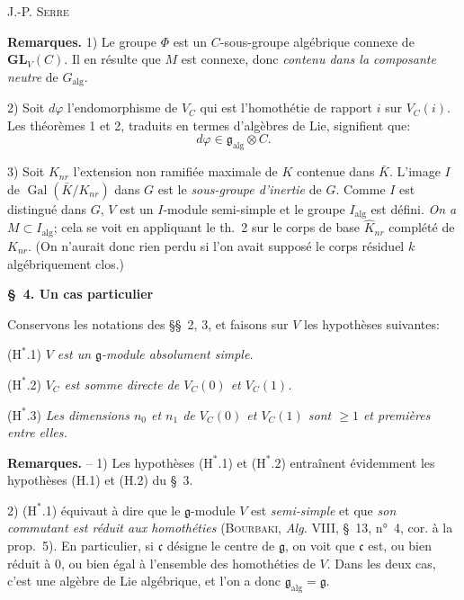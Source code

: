 \begin{center}\small J.-P. \textsc{Serre}\end{center}
\textbf{Remarques.} 1) Le groupe $\varPhi$ est un $C$-sous-groupe algébrique connexe de $\mathbf{GL}_V(C)$. Il en résulte que $M$ est connexe, donc \textit{contenu dans la composante neutre} de $G_{\mathrm{alg}}$.

2) Soit $d\varphi$ l’endomorphisme de $V_C$ qui est l’homothétie de rapport $i$ sur $V_C(i)$. Les théorèmes 1 et 2, traduits en termes d’algèbres de Lie, signifient que:
\[
d\varphi\in\mathfrak{g}_{\mathrm{alg}}\otimes C.
\]

3) Soit $K_{nr}$ l’extension non ramifiée maximale de $K$ contenue dans $\bar K$. L’image $I$ de $\operatorname{Gal}(\bar K/K_{nr})$ dans $G$ est le \textit{sous-groupe d’inertie} de $G$. Comme $I$ est distingué dans $G$, $V$ est un $I$-module semi-simple et le groupe $I_{\mathrm{alg}}$ est défini. \textit{On a $M\subset I_{\mathrm{alg}}$};%
 cela se voit en appliquant le th.~2 sur le corps de base $\hat K_{nr}$ complété de $K_{nr}$. (On n’aurait donc rien perdu si l’on avait supposé le corps résiduel $k$ algébriquement clos.)

\begin{center}\textbf{\S~4. Un cas particulier}\end{center}

Conservons les notations des \S\S~2, 3, et faisons sur $V$ les hypothèses suivantes:

($\mathrm{H}^{*}$.1) \textit{$V$ est un $\mathfrak{g}$-module absolument simple.}

($\mathrm{H}^{*}$.2) \textit{$V_C$ est somme directe de $V_C(0)$ et $V_C(1)$.}

($\mathrm{H}^{*}$.3) \textit{Les dimensions $n_0$ et $n_1$ de $V_C(0)$ et $V_C(1)$ sont $\geqslant 1$ et premières entre elles.}

\textbf{Remarques.} -- 1) Les hypothèses ($\mathrm{H}^{*}$.1) et ($\mathrm{H}^{*}$.2) entraînent évidemment les hypothèses (H.1) et (H.2) du \S~3.

2) ($\mathrm{H}^{*}$.1) équivaut à dire que le $\mathfrak{g}$-module $V$ est \textit{semi-simple} et que \textit{son commutant est réduit aux homothéties} (\textsc{Bourbaki}, \textit{Alg.} VIII, \S~13, n°~4, cor. à la prop.~5). En particulier, si $\mathfrak{c}$ désigne le centre de $\mathfrak{g}$, on voit que $\mathfrak{c}$ est, ou bien réduit à $0$, ou bien égal à l’ensemble des homothéties de $V$. Dans les deux cas, c’est une algèbre de Lie algébrique, et l’on a donc $\mathfrak{g}_{\mathrm{alg}}=\mathfrak{g}$.

